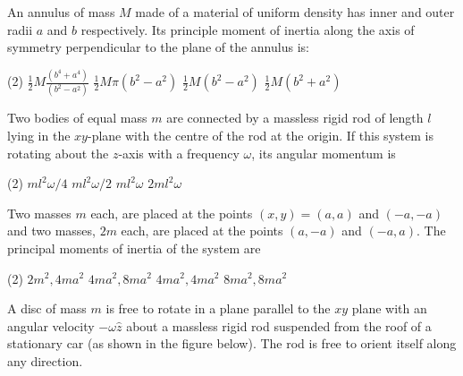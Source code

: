 \begin{enumerate}
\begin{minipage}{\textwidth}
	\item An annulus of mass $M$ made of a material of uniform density has inner and outer radii $a$ and $b$ respectively. Its principle moment of inertia along the axis of symmetry perpendicular to the plane of the annulus is:
\end{minipage}
\begin{tasks}(2)
	\task[\textbf{A.}] $\frac{1}{2} M \frac{\left(b^{4}+a^{4}\right)}{\left(b^{2}-a^{2}\right)}$
	\task[\textbf{B.}]$\frac{1}{2} M \pi\left(b^{2}-a^{2}\right)$
	\task[\textbf{C.}]$\frac{1}{2} M\left(b^{2}-a^{2}\right)$
	\task[\textbf{D.}]$\frac{1}{2} M\left(b^{2}+a^{2}\right)$
\end{tasks}
\begin{minipage}{\textwidth}
	\item Two bodies of equal mass $m$ are connected by a massless rigid rod of length $l$ lying in the $x y$-plane with the centre of the rod at the origin. If this system is rotating about the $z$-axis with a frequency $\omega$, its angular momentum is
\end{minipage}
\begin{tasks}(2)
	\task[\textbf{A.}] $m l^{2} \omega / 4$
	\task[\textbf{B.}]$m l^{2} \omega / 2$
	\task[\textbf{C.}]$m l^{2} \omega$
	\task[\textbf{D.}]$2 m l^{2} \omega$
\end{tasks}
\begin{minipage}{\textwidth}
	\item Two masses $m$ each, are placed at the points $(x, y)=(a, a)$ and $(-a,-a)$ and two masses, $2 m$ each, are placed at the points $(a,-a)$ and $(-a, a)$. The principal moments of inertia of the system are
\end{minipage}
\begin{tasks}(2)
	\task[\textbf{A.}] $2 m^{2}, 4 m a^{2}$
	\task[\textbf{B.}]$4 m a^{2}, 8 m a^{2}$
	\task[\textbf{C.}] $4 m a^{2}, 4 m a^{2}$
	\task[\textbf{D.}] $8 m a^{2}, 8 m a^{2}$
\end{tasks}
\begin{minipage}{\textwidth}
	\item A disc of mass $m$ is free to rotate in a plane parallel to the $x y$ plane with an angular velocity $-\omega \hat{z}$ about a massless rigid rod suspended from the roof of a stationary car (as shown in the figure below). The rod is free to orient itself along any direction.

\end{minipage}
\end{enumerate}
